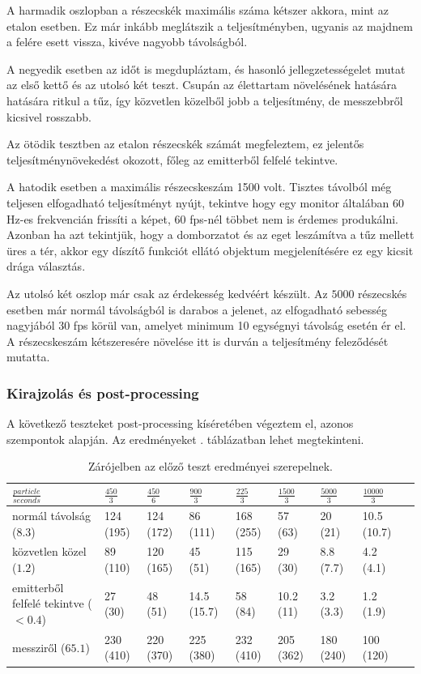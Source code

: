 A harmadik oszlopban a részecskék maximális száma kétszer akkora, mint az etalon esetben. Ez már inkább meglátszik a teljesítményben, ugyanis az majdnem a felére esett vissza, kivéve nagyobb távolságból.

A negyedik esetben az időt is megdupláztam, és hasonló jellegzetességelet mutat az első kettő és az utolsó két teszt. Csupán az élettartam növelésének hatására hatására ritkul a tűz, így közvetlen közelből jobb a teljesítmény, de messzebbről kicsivel rosszabb. 

Az ötödik tesztben az etalon részecskék számát megfeleztem, ez jelentős teljesítménynövekedést okozott, főleg az emitterből felfelé tekintve.

A hatodik esetben a maximális részecskeszám 1500 volt. Tisztes távolból még teljesen elfogadható teljesítményt nyújt, tekintve hogy egy monitor általában 60 Hz-es frekvencián frissíti a képet, 60 fps-nél többet nem is érdemes produkálni. Azonban ha azt tekintjük, hogy a domborzatot és az eget leszámítva a tűz mellett üres a tér, akkor egy díszítő funkciót ellátó objektum megjelenítésére ez egy kicsit drága választás.

Az utolsó két oszlop már csak az érdekesség kedvéért készült. Az $5000$ részecskés esetben már normál távolságból is darabos a jelenet, az elfogadható sebesség nagyjából 30 fps körül van, amelyet minimum 10 egységnyi távolság esetén ér el. A részecskeszám kétszeresére növelése itt is durván a teljesítmény feleződését mutatta.

\subsubsection{Kirajzolás és post-processing}
A következő teszteket post-processing kíséretében végeztem el, azonos szempontok alapján. Az eredményeket . táblázatban lehet megtekinteni.

\begin{table}[h!]
\centering
\begin{tabular}{ m{10em}|C{1cm}|C{1cm}|C{1cm}|C{1cm}|C{1cm}|C{1cm}|C{1cm}|C{1cm}| } 
 $\frac{particle}{seconds}$ & $\frac{450}{3}$ & $\frac{450}{6}$ & $\frac{900}{3}$ & $\frac{225}{3}$ & $\frac{1500}{3}$ & $\frac{5000}{3}$ & $\frac{10000}{3}$ \\  \hline
 
 normál távolság ($8.3$)                   & 124  (195) & 124 (172)  & 86 (111)     & 168 (255)  & 57 (63)     & 20 (21) & 10.5 (10.7) \\  \hline
 közvetlen közel ($1.2$)                    & 89 (110)   & 120 (165)  & 45 (51)       & 115 (165)  & 29 (30)     & 8.8 (7.7) & 4.2 (4.1) \\  \hline
 emitterből felfelé tekintve ($<0.4$) & 27 (30)     &  48 (51)    & 14.5 (15.7) & 58 (84)      & 10.2 (11)  & 3.2 (3.3) & 1.2 (1.9)  \\ \hline
 messziről ($65.1$)                            & 230 (410) &  220 (370) & 225 (380)   & 232 (410)  & 205 (362)   & 180 (240) & 100 (120) \\ 
 \hline
\end{tabular}
\caption{Zárójelben az előző teszt eredményei szerepelnek.}
\label{table:2}
\end{table}

